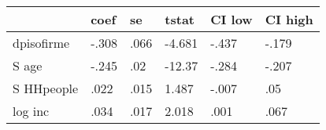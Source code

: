 \begin{table}[htbp]
\begin{tabular}{llllll} \hline \hline
 & coef  & se  & tstat  & CI low  & CI high  \\  \hline 
dpisofirme & -.308 & .066 & -4.681 & -.437 & -.179 \\  
S age & -.245 & .02 & -12.37 & -.284 & -.207 \\  
S HHpeople & .022 & .015 & 1.487 & -.007 & .05 \\  
log inc & .034 & .017 & 2.018 & .001 & .067 \\  
\hline \hline \end{tabular}
\end{table}
